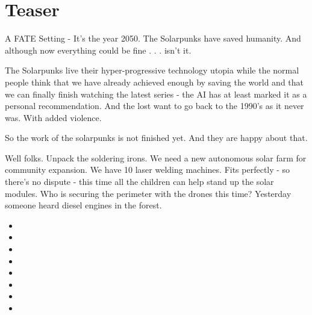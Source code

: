 \section{Teaser}

A FATE Setting - It's the year 2050. The Solarpunks have saved humanity. And although now everything could be fine . . . isn't it.

The Solarpunks live their hyper-progressive technology utopia while the normal people think that we have already achieved enough by saving the world and that we can finally finish watching the latest series - the AI has at least marked it as a personal recommendation. And the lost want to go back to the 1990's as it never was. With added violence.

So the work of the solarpunks is not finished yet. And they are happy about that.

\begin{solartalk}[title=Solarpunk Photovoltaik site]
    Well folks. Unpack the soldering irons. We need a new autonomous solar farm for community expansion.
    We have 10 laser welding machines. Fits perfectly - so there's no dispute - this time all the children can help stand up the solar modules. Who is securing the perimeter with the drones this time? Yesterday someone heard diesel engines in the forest.
\end{solartalk}

\begin{solartalk}[title=Solarpunk Photovoltaik site - later]
    \begin{itemize}
        \item {}
        \item {}
        \item {}
        \item {}
        \item {}
        \item {}
        \item {}
        \item {}
    \end{itemize}
\end{solartalk}

